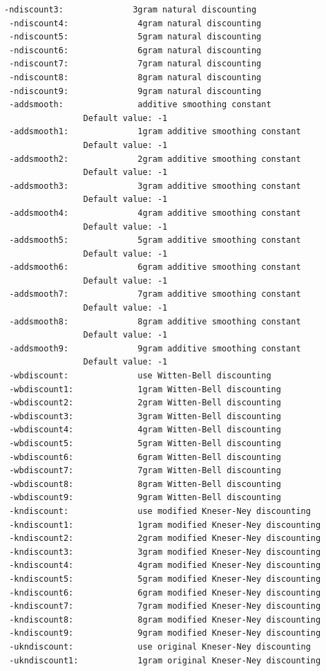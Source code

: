 \documentclass[11pt]{article}
\begin{document}
\begin{Verbatim}[commandchars=\\\{\}]
 -ndiscount3:              3gram natural discounting
 -ndiscount4:              4gram natural discounting
 -ndiscount5:              5gram natural discounting
 -ndiscount6:              6gram natural discounting
 -ndiscount7:              7gram natural discounting
 -ndiscount8:              8gram natural discounting
 -ndiscount9:              9gram natural discounting
 -addsmooth:               additive smoothing constant
                Default value: -1
 -addsmooth1:              1gram additive smoothing constant
                Default value: -1
 -addsmooth2:              2gram additive smoothing constant
                Default value: -1
 -addsmooth3:              3gram additive smoothing constant
                Default value: -1
 -addsmooth4:              4gram additive smoothing constant
                Default value: -1
 -addsmooth5:              5gram additive smoothing constant
                Default value: -1
 -addsmooth6:              6gram additive smoothing constant
                Default value: -1
 -addsmooth7:              7gram additive smoothing constant
                Default value: -1
 -addsmooth8:              8gram additive smoothing constant
                Default value: -1
 -addsmooth9:              9gram additive smoothing constant
                Default value: -1
 -wbdiscount:              use Witten-Bell discounting
 -wbdiscount1:             1gram Witten-Bell discounting
 -wbdiscount2:             2gram Witten-Bell discounting
 -wbdiscount3:             3gram Witten-Bell discounting
 -wbdiscount4:             4gram Witten-Bell discounting
 -wbdiscount5:             5gram Witten-Bell discounting
 -wbdiscount6:             6gram Witten-Bell discounting
 -wbdiscount7:             7gram Witten-Bell discounting
 -wbdiscount8:             8gram Witten-Bell discounting
 -wbdiscount9:             9gram Witten-Bell discounting
 -kndiscount:              use modified Kneser-Ney discounting
 -kndiscount1:             1gram modified Kneser-Ney discounting
 -kndiscount2:             2gram modified Kneser-Ney discounting
 -kndiscount3:             3gram modified Kneser-Ney discounting
 -kndiscount4:             4gram modified Kneser-Ney discounting
 -kndiscount5:             5gram modified Kneser-Ney discounting
 -kndiscount6:             6gram modified Kneser-Ney discounting
 -kndiscount7:             7gram modified Kneser-Ney discounting
 -kndiscount8:             8gram modified Kneser-Ney discounting
 -kndiscount9:             9gram modified Kneser-Ney discounting
 -ukndiscount:             use original Kneser-Ney discounting
 -ukndiscount1:            1gram original Kneser-Ney discounting

\end{Verbatim}
\end{document}

